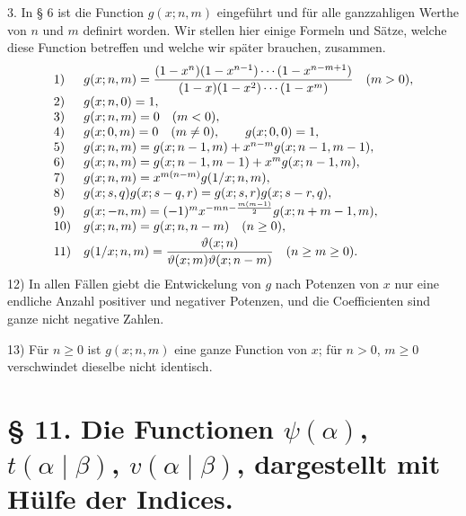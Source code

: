 3. In § 6 ist die Function $g(x;n,m)$ eingeführt und für alle ganzzahligen Werthe von $n$ und $m$ definirt worden. Wir stellen hier einige Formeln und Sätze, welche diese Function betreffen und welche wir später brauchen, zusammen.
\[
\begin{array}{ll}
1)&\displaystyle g(x;n,m)={ (1-x^n)(1-x^{n-1})\cdots(1-x^{n-m+1})\over(1-x)(1-x^2)\cdots(1-x^m)}\quad(m>0),\\[1.0ex]
2)&g(x;n,0)=1,\\
3)&g(x;n,m)=0\quad(m<0),\\
4)&g(x;0,m)=0\quad(m\ne0),\qquad g(x;0,0)=1,\\
5)&g(x;n,m)=g(x;n-1,m)+x^{n-m}g(x;n-1,m-1),\\
6)&g(x;n,m)=g(x;n-1,m-1)+x^m g(x;n-1,m),\\
7)&g(x;n,m)=x^{m(n-m)}g(1/x;n,m),\\
8)&g(x;s,q)g(x;s-q,r)=g(x;s,r)g(x;s-r,q),\\
9)&g(x;-n,m)=(-1)^m x^{-mn-{m(m-1)\over2}}g(x;n+m-1,m),\\
10)&g(x;n,m)=g(x;n,n-m)\quad(n\ge0),\\[0.5ex]
11)&\displaystyle g(1/x;n,m)={\vartheta(x;n)\over\vartheta(x;m)\vartheta(x;n-m)}\quad(n\ge m\ge0).
\end{array}
\]
12) In allen Fällen giebt die Entwickelung von $g$ nach Potenzen von $x$ nur eine endliche Anzahl positiver und negativer Potenzen, und die Coefficienten sind ganze nicht negative Zahlen.

13) Für $n\ge0$ ist $g(x;n,m)$ eine ganze Function von $x$; für $n>0$, $m\ge0$ verschwindet dieselbe nicht identisch.

\section*{§ 11. Die Functionen $\psi(\alpha)$, $t(\alpha\mid\beta)$, $v(\alpha\mid\beta)$, dargestellt mit Hülfe der Indices.}

